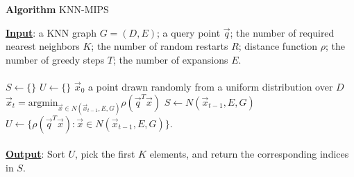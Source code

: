 \documentclass{article}
\begin{document}
\begin{algorithm}
\captionsetup{labelformat=empty}
\caption{\textbf{Algorithm} KNN-MIPS}
\begin{algorithmic}

\STATE \textbf{\underline{Input}}: a KNN graph $G = (D, E)$; a query point $\overrightarrow{q}$; the number of required nearest neighbors $K$; the number
of random restarts $R$; distance function $\rho$; the number of greedy steps $T$; the number of expansions $E$. \\~\\ 
\STATE $S \gets \{\}$ 
\STATE $U \gets \{\}$ 
    \STATE $\overrightarrow{x}_{0}$ a point drawn randomly from a uniform distribution over $D$
        \STATE $\overrightarrow{x}_{t} = \text{argmin}_{\overrightarrow{x} \in N(\overrightarrow{x}_{t-1},E,G)} 
        \rho(\overrightarrow{q}^T \overrightarrow{x})$
        \STATE $S \gets N(\overrightarrow{x}_{t-1},E, G)$  
        \STATE $U \gets \{\rho(\overrightarrow{q}^T \overrightarrow{x}) : \overrightarrow{x} \in N(\overrightarrow{x}_{t-1},E, G)\}$.
    \ENDFOR
\ENDFOR \\~\\ 
\STATE \textbf{\underline{Output}}: Sort $U$, pick the first $K$ elements, and return the corresponding indices in $S$.

\end{algorithmic}
\end{algorithm}
\end{document}
